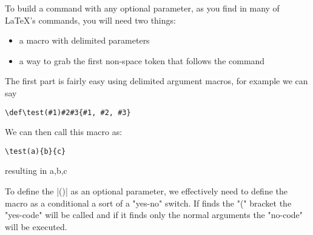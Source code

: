 \begin{comment}
\end{comment}

\begin{teX}
\def\choosemacro{%
 \ifx\ifoptions [%
     \let\choice = \elidebefore 
 \else
    \let\choice = \elideafter
 \fi
\choice
}
\end{teX}



\begin{teX}


\end{teX}

\begin{teX}
\def \xxWithOpt [#1] #2{...}
\def\xxNoOpt #2{...}

\def\xx {%
\futurelet\xxLookedAtToken
    \xxDecide
}

\def\xxDecide {%
 \ifx\xxLookedAtToken [%
\let\next = \xxWithOpt
\else
 \let\next = \xxNoOpt
 \fi
\next
}
\end{teX}



To build a command with any optional parameter, as you find in many of LaTeX's commands, you will need two things:

\begin{itemize}
\item a macro with delimited parameters

\item a way to grab the first non-space token that follows the command
\end{itemize}


The first part is fairly easy using delimited argument macros, for example we can say

\begin{verbatim}
\def\test(#1)#2#3{#1, #2, #3}
\end{verbatim}

We can then call this macro as:

\begin{verbatim}
\test(a){b}{c}
\end{verbatim}


resulting in a,b,c

To define the |()| as an optional parameter, we effectively need to define the macro as a conditional a sort of a "yes-no" switch. If \tex finds the "(" bracket the "yes-code" will be called and if it finds only the normal arguments the "no-code" will be executed.

